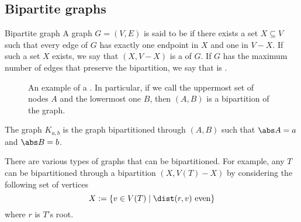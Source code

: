 \documentclass[a4paper, 12pt]{report}
\begin{document}
    \subsection{Bipartite graphs}

    \begin{frameddefn}{Bipartite graph}
        A graph $G = (V, E)$ is said to be  if there exists a set $X \subseteq V$ such that every edge of $G$ has exactly one endpoint in $X$ and one in $V - X$. If such a set $X$ exists, we say that $(X, V - X)$ is a  of $G$. If $G$ has the maximum number of edges that preserve the bipartition, we say that is .
    \end{frameddefn}

    \begin{figure}[H]
        \centering
        \caption{An example of a . In particular, if we call the uppermost set of nodes $A$ and the lowermost one $B$, then $(A, B)$ is a bipartition of the graph.}
    \end{figure}

    The graph $K_{a, b}$ is the  graph bipartitioned through $(A, B)$ such that $\abs A = a$ and $\abs B = b$.

    There are various types of graphs that can be bipartitioned. For example, any  $T$ can be bipartitioned through a bipartition $(X, V(T) - X)$ by considering the following set of vertices $$X := \{v \in V(T) \mid \dist(r, v) \ \mathrm{even}\}$$ where $r$ is $T$'s root.
\end{document}
